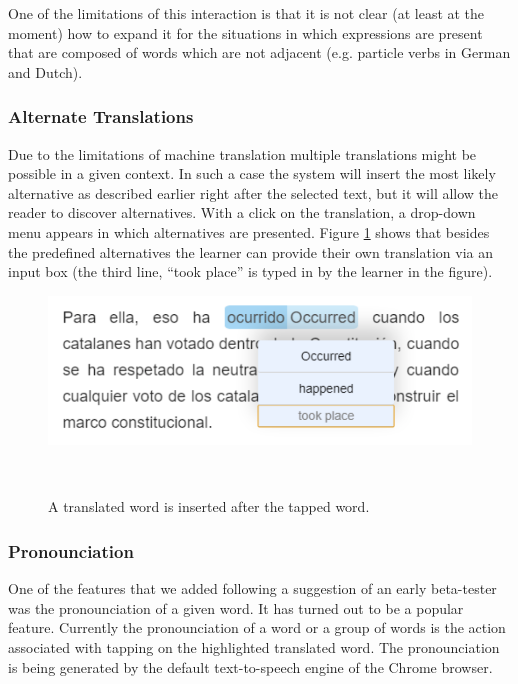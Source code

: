 One of the limitations of this interaction is that it is not clear (at least at the moment) how to expand it for the situations in which expressions are present that are composed of words which are not adjacent (e.g. particle verbs in German and Dutch).


\subsubsection{Alternate Translations}
Due to the limitations of machine translation multiple translations might be possible in a given context. In such a case the system will insert the most likely alternative as described earlier right after the selected text, but it will allow the reader to discover alternatives. With a click on the translation, a drop-down menu appears in which alternatives are presented. Figure \ref{fig:registrations} shows that besides the predefined alternatives the learner can provide their own translation via an input box (the third line, ``took place'' is typed in by the learner in the figure). 


\begin{figure}[h!]
\centering
  \includegraphics[width=0.8\columnwidth]{figures/translation_alter_menu}
  \caption{A translated word is inserted after the tapped word.}~\label{fig:registrations}
\end{figure}

\subsubsection{Pronounciation}
One of the features that we added following a suggestion of an early beta-tester was the pronounciation of a given word. It has turned out to be a popular feature. Currently the pronounciation of a word or a group of words is the action associated with tapping on the highlighted translated word. The pronounciation is being generated by the default text-to-speech engine of the Chrome browser. 


